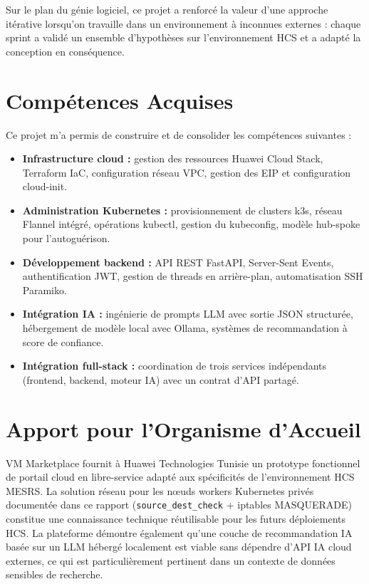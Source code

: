Sur le plan du génie logiciel, ce projet a renforcé la valeur d'une approche itérative
lorsqu'on travaille dans un environnement à inconnues externes : chaque sprint a validé
un ensemble d'hypothèses sur l'environnement HCS et a adapté la conception en
conséquence.

\section*{Compétences Acquises}

Ce projet m'a permis de construire et de consolider les compétences suivantes :

\begin{itemize}
  \item \textbf{Infrastructure cloud :} gestion des ressources Huawei Cloud Stack,
        Terraform IaC, configuration réseau VPC, gestion des EIP et configuration
        cloud-init.
  \item \textbf{Administration Kubernetes :} provisionnement de clusters k3s,
        réseau Flannel intégré, opérations kubectl, gestion du kubeconfig,
        modèle hub-spoke pour l'autoguérison.
  \item \textbf{Développement backend :} API REST FastAPI, Server-Sent Events,
        authentification JWT, gestion de threads en arrière-plan, automatisation SSH
        Paramiko.
  \item \textbf{Intégration IA :} ingénierie de prompts LLM avec sortie JSON
        structurée, hébergement de modèle local avec Ollama, systèmes de recommandation
        à score de confiance.
  \item \textbf{Intégration full-stack :} coordination de trois services indépendants
        (frontend, backend, moteur IA) avec un contrat d'API partagé.
\end{itemize}

\section*{Apport pour l'Organisme d'Accueil}

VM Marketplace fournit à Huawei Technologies Tunisie un prototype fonctionnel de portail
cloud en libre-service adapté aux spécificités de l'environnement HCS MESRS. La
solution réseau pour les nœuds workers Kubernetes privés documentée dans ce rapport
(\texttt{source\_dest\_check} + iptables MASQUERADE) constitue une connaissance
technique réutilisable pour les futurs déploiements HCS. La plateforme démontre
également qu'une couche de recommandation IA basée sur un LLM hébergé localement est
viable sans dépendre d'API IA cloud externes, ce qui est particulièrement pertinent
dans un contexte de données sensibles de recherche.

